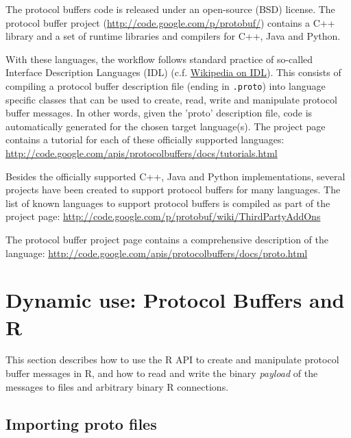 The protocol buffers code is released under an open-source (BSD) license. The
protocol buffer project (\url{http://code.google.com/p/protobuf/})
contains a C++ library and a set of runtime libraries and compilers for
C++, Java and Python.

With these languages, the workflow follows standard practice of so-called
Interface Description Languages (IDL)
(c.f. \href{http://en.wikipedia.org/wiki/Interface_description_language}{Wikipedia
  on IDL}).  This consists of compiling a protocol buffer description file
(ending in \texttt{.proto}) into language specific classes that can be used
to create, read, write and manipulate protocol buffer messages. In other
words, given the 'proto' description file, code is automatically generated
for the chosen target language(s). The project page contains a tutorial for
each of these officially supported languages:
\url{http://code.google.com/apis/protocolbuffers/docs/tutorials.html}

Besides the officially supported C++, Java and Python implementations, several projects have been
created to support protocol buffers for many languages. The list of known
languages to support protocol buffers is compiled as part of the
project page: \url{http://code.google.com/p/protobuf/wiki/ThirdPartyAddOns}

The protocol buffer project page contains a comprehensive
description of the language: \url{http://code.google.com/apis/protocolbuffers/docs/proto.html}

%

\section{Dynamic use: Protocol Buffers and R}

This section describes how to use the R API to create and manipulate
protocol buffer messages in R, and how to read and write the
binary \emph{payload} of the messages to files and arbitrary binary
R connections.

\subsection{Importing proto files}

